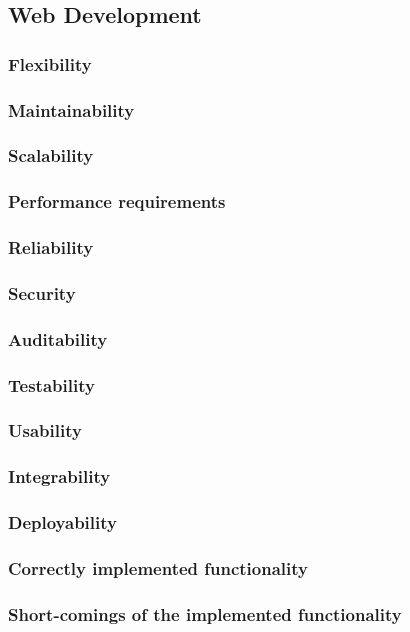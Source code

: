 \documentclass{article}
\begin{document}
\subsection{Web Development}
        \subsubsection{Flexibility}
        \subsubsection{Maintainability}
        \subsubsection{Scalability}
        \subsubsection{Performance requirements}
        \subsubsection{Reliability}
        \subsubsection{Security}
        \subsubsection{Auditability}
        \subsubsection{Testability}
        \subsubsection{Usability}
        \subsubsection{Integrability}
        \subsubsection{Deployability}
        \subsubsection{Correctly implemented functionality}
        \subsubsection{Short-comings of the implemented functionality}
\end{document}
